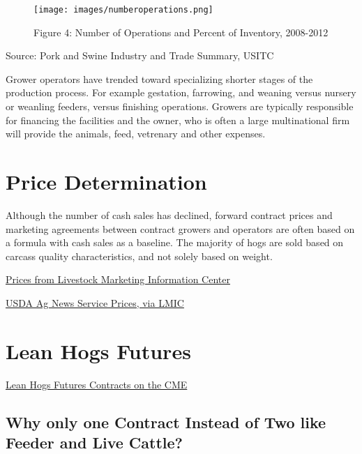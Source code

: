 \documentclass[
  letterpaper,
  DIV=11,
  numbers=noendperiod]{scrreprt}
\begin{document}
\begin{figure}

{\centering \texttt{[image: images/numberoperations.png]}

}

\caption{Figure 4: Number of Operations and Percent of Inventory,
2008-2012}

\end{figure}

Source: Pork and Swine Industry and Trade Summary, USITC

Grower operators have trended toward specializing shorter stages of the
production process. For example gestation, farrowing, and weaning versus
nursery or weanling feeders, versus finishing operations. Growers are
typically responsible for financing the facilities and the owner, who is
often a large multinational firm will provide the animals, feed,
vetrenary and other expenses.

\hypertarget{price-determination}{%
\section{Price Determination}\label{price-determination}}

Although the number of cash sales has declined, forward contract prices
and marketing agreements between contract growers and operators are
often based on a formula with cash sales as a baseline. The majority of
hogs are sold based on carcass quality characteristics, and not solely
based on weight.

\href{http://www.lmic.info/spreadsheet/prices-and-production}{Prices
from Livestock Marketing Information Center}

\href{http://www.lmic.info/quick_market_reports/hogs}{USDA Ag News
Service Prices, via LMIC}

\hypertarget{lean-hogs-futures}{%
\section{Lean Hogs Futures}\label{lean-hogs-futures}}

\href{http://www.cmegroup.com/trading/agricultural/livestock/lean-hogs.html}{Lean
Hogs Futures Contracts on the CME}

\hypertarget{why-only-one-contract-instead-of-two-like-feeder-and-live-cattle}{%
\subsection{Why only one Contract Instead of Two like Feeder and Live
Cattle?}\label{why-only-one-contract-instead-of-two-like-feeder-and-live-cattle}}
\end{document}
